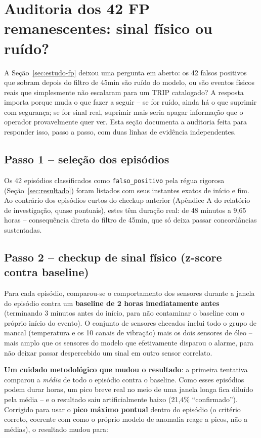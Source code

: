 \documentclass[11pt,a4paper]{article}
\begin{document}
\section{Auditoria dos 42 FP remanescentes: sinal físico ou ruído?}
\label{sec:auditoria42}

A Seção~\ref{sec:estudo-fp} deixou uma pergunta em aberto: os 42
falsos positivos que sobram depois do filtro de 45min são ruído do
modelo, ou são eventos físicos reais que simplesmente não escalaram
para um TRIP catalogado? A resposta importa porque muda o que fazer a
seguir -- se for ruído, ainda há o que suprimir com segurança; se for
sinal real, suprimir mais seria apagar informação que o operador
provavelmente quer ver. Esta seção documenta a auditoria feita para
responder isso, passo a passo, com duas linhas de evidência
independentes.

\subsection{Passo 1 -- seleção dos episódios}

Os 42 episódios classificados como \texttt{falso\_positivo} pela
régua rigorosa (Seção~\ref{sec:resultado}) foram listados com seus
instantes exatos de início e fim. Ao contrário dos episódios curtos
do checkup anterior (Apêndice A do relatório de investigação, quase
pontuais), estes têm duração real: de 48 minutos a 9,65 horas --
consequência direta do filtro de 45min, que só deixa passar
concordâncias sustentadas.

\subsection{Passo 2 -- checkup de sinal físico (z-score contra baseline)}

Para cada episódio, comparou-se o comportamento dos sensores durante
a janela do episódio contra um \textbf{baseline de 2 horas
imediatamente antes} (terminando 3 minutos antes do início, para não
contaminar o baseline com o próprio início do evento). O conjunto de
sensores checados inclui todo o grupo de mancal (temperatura e os 10
canais de vibração) mais os dois sensores de óleo -- mais amplo que
os sensores do modelo que efetivamente disparou o alarme, para não
deixar passar despercebido um sinal em outro sensor correlato.

\textbf{Um cuidado metodológico que mudou o resultado}: a primeira
tentativa comparou a \emph{média} de todo o episódio contra o
baseline. Como esses episódios podem durar horas, um pico breve real
no meio de uma janela longa fica diluído pela média -- e o resultado
saiu artificialmente baixo (21,4\% ``confirmado''). Corrigido para
usar o \textbf{pico máximo pontual} dentro do episódio (o critério
correto, coerente com como o próprio modelo de anomalia reage a
picos, não a médias), o resultado mudou para:
\end{document}
